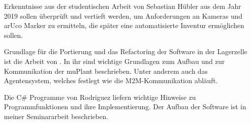     Erkenntnisse aus der studentischen Arbeit von Sebastian Hübler aus dem Jahr 2019 \cite{Hübler2019} sollen überprüft
    und vertieft werden, um Anforderungen an Kameras und arUco Marker zu ermitteln, die später eine automatisierte
    Inventur ermöglichen sollen.

    Grundlage für die Portierung und das Refactoring der Software in der Lagerzelle ist die Arbeit von \cite{LarsKistner2017}.
    In ihr sind wichtige Grundlagen zum Aufbau und zur Kommunikation der muPlant beschrieben. Unter anderem auch das Agentensystem, welches festlegt wie die M2M-Kommunikation abläuft.

    Die C\# Programme von Rodriguez liefern wichtige Hinweise zu Programmfunktionen und ihre Implementierung. 
    Der Aufbau der Software ist in meiner Seminararbeit beschrieben. 


